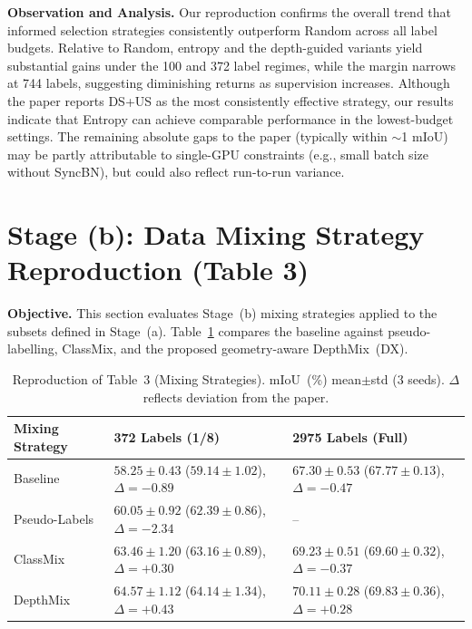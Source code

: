 \noindent
\textbf{Observation and Analysis.} Our reproduction confirms the overall
trend that informed selection strategies consistently outperform Random
across all label budgets. Relative to Random, entropy and the
depth-guided variants yield substantial gains under the 100 and 372
label regimes, while the margin narrows at 744 labels, suggesting
diminishing returns as supervision increases. Although the paper reports
DS+US as the most consistently effective strategy, our results indicate
that Entropy can achieve comparable performance in the lowest-budget
settings. The remaining absolute gaps to the paper (typically within
$\sim$1 mIoU) may be partly attributable to single-GPU constraints
(e.g., small batch size without SyncBN), but could also reflect
run-to-run variance.

\clearpage
\section{Stage (b): Data Mixing Strategy Reproduction (Table 3)}
\label{sec:stage_ab_table3}

\noindent
\textbf{Objective.} This section evaluates Stage~(b) mixing strategies
applied to the subsets defined in Stage~(a).
Table~\ref{tab:table3_repro} compares the baseline against
pseudo-labelling, ClassMix, and the proposed geometry-aware
DepthMix~(DX).

\begin{table}[H]
\centering
\caption{Reproduction of Table~3 (Mixing Strategies). mIoU~(\%)
mean$\pm$std (3 seeds). $\Delta$ reflects deviation from the paper.}
\label{tab:table3_repro}
\renewcommand{\arraystretch}{1.2}
\begin{tabularx}{\textwidth}{lXX}
\toprule
\textbf{Mixing Strategy} &
\textbf{372 Labels (1/8)} &
\textbf{2975 Labels (Full)} \\
\midrule
Baseline &
$58.25 \pm 0.43$ {\scriptsize ($59.14 \pm 1.02$), $\Delta=-0.89$} &
$67.30 \pm 0.53$ {\scriptsize ($67.77 \pm 0.13$), $\Delta=-0.47$} \\
Pseudo-Labels &
$60.05 \pm 0.92$ {\scriptsize ($62.39 \pm 0.86$), $\Delta=-2.34$} &
-- \\
ClassMix &
$63.46 \pm 1.20$ {\scriptsize ($63.16 \pm 0.89$), $\Delta=+0.30$} &
$69.23 \pm 0.51$ {\scriptsize ($69.60 \pm 0.32$), $\Delta=-0.37$} \\
DepthMix &
$64.57 \pm 1.12$ {\scriptsize ($64.14 \pm 1.34$), $\Delta=+0.43$} &
$70.11 \pm 0.28$ {\scriptsize ($69.83 \pm 0.36$), $\Delta=+0.28$} \\
\bottomrule
\end{tabularx}
\end{table}

